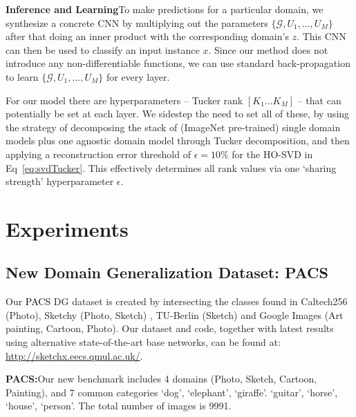 \documentclass[10pt,twocolumn,letterpaper]{article}
\begin{document}
\vspace{0.1cm}\noindent\textbf{Inference and Learning}\quad To make predictions for a particular domain, we synthesize a concrete CNN by multiplying out the parameters $\{\mathcal{G},U_1,\dots,U_M\}$ after that doing an inner product with the corresponding domain's $z$. This CNN can then be used to classify an input instance $x$. Since our method does not introduce any non-differentiable functions, we can use standard back-propagation to learn $\{\mathcal{G},U_1,\dots,U_M\}$ for every layer.

For our model there are hyperparameters -- Tucker rank $[K_1\dots K_M]$ -- that can potentially be set at each layer. We sidestep the need to set all of these, by using the strategy of decomposing the stack of (ImageNet pre-trained) single domain models plus one agnostic domain model through Tucker decomposition, and then applying a reconstruction error threshold of $\epsilon=10\%$ for the HO-SVD in Eq~\ref{eq:svdTucker}. This effectively determines all rank values via one `sharing strength' hyperparameter $\epsilon$.


\section{Experiments}
\subsection{New Domain Generalization Dataset: PACS}\label{sub:ourDataset}
Our \textcolor{black}{PACS} DG dataset is created by intersecting the classes found in Caltech256 (Photo), Sketchy (Photo, Sketch) \cite{sangkloy2016sketchy}, TU-Berlin (Sketch) \cite{eitz2012howToSketch} and Google Images (Art painting, Cartoon, Photo). Our dataset and code, together with latest results using alternative state-of-the-art base networks, can be found at: \url{http://sketchx.eecs.qmul.ac.uk/}.



\noindent\textbf{PACS:}\quad Our new benchmark includes 4 domains (Photo, Sketch, Cartoon, Painting), and 7 common categories `dog', `elephant', `giraffe'. `guitar', `horse', `house', `person'. The total number of images is 9991. 
\end{document}

